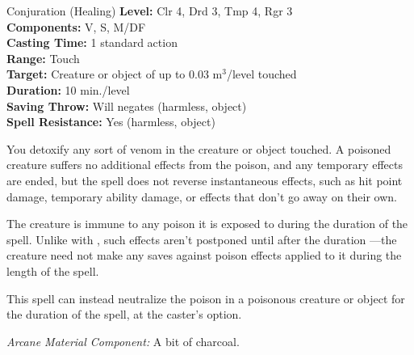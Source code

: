 {Conjuration (Healing)}
{
	\textbf{Level:}
	Clr 4, Drd 3, Tmp 4, Rgr 3\\
	\textbf{Components:}
	V, S, M/DF\\
	\textbf{Casting Time:}
	1 standard action\\
	\textbf{Range:}
	Touch\\
	\textbf{Target:}
	Creature or object of up to 0.03 m$^3$/level touched\\
	\textbf{Duration:}
	10 min./level\\
	\textbf{Saving Throw:}
	Will negates (harmless, object)\\
	\textbf{Spell Resistance:}
	Yes (harmless, object)\\
}
{
	You detoxify any sort of venom in the creature or object touched. A poisoned creature suffers no additional effects from the poison, and any temporary effects are ended, but the spell does not reverse instantaneous effects, such as hit point damage, temporary ability damage, or effects that don't go away on their own.

	The creature is immune to any poison it is exposed to during the duration of the spell. Unlike with , such effects aren't postponed until after the duration ---the creature need not make any saves against poison effects applied to it during the length of the spell.

	This spell can instead neutralize the poison in a poisonous creature or object for the duration of the spell, at the caster's option.

	\textit{Arcane Material Component:}
	A bit of charcoal.

}
